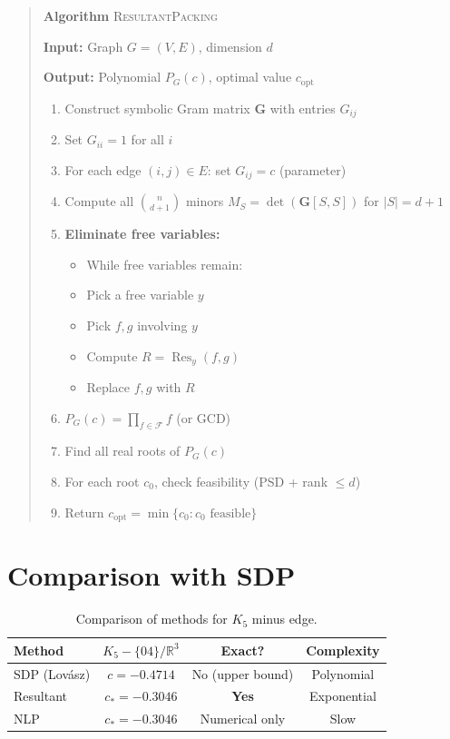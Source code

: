 \documentclass[11pt]{article}
\theoremstyle{definition}
\begin{document}
\begin{quote}
\textbf{Algorithm} \textsc{ResultantPacking}

\textbf{Input:} Graph $G = (V,E)$, dimension $d$

\textbf{Output:} Polynomial $P_G(c)$, optimal value $c_{\mathrm{opt}}$

\begin{enumerate}
    \item Construct symbolic Gram matrix $\mathbf{G}$ with entries $G_{ij}$
    \item Set $G_{ii} = 1$ for all $i$
    \item For each edge $(i,j) \in E$: set $G_{ij} = c$ (parameter)
    \item Compute all $\binom{n}{d+1}$ minors $M_S = \det(\mathbf{G}[S,S])$
    for $|S| = d+1$
    \item \textbf{Eliminate free variables:}
    \begin{itemize}
        \item While free variables remain:
        \item Pick a free variable $y$
        \item Pick $f, g$ involving $y$
        \item Compute $R = \operatorname{Res}_y(f, g)$
        \item Replace $f, g$ with $R$
    \end{itemize}
    \item $P_G(c) = \prod_{f \in \mathcal{F}} f$ (or GCD)
    \item Find all real roots of $P_G(c)$
    \item For each root $c_0$, check feasibility (PSD + rank $\le d$)
    \item Return $c_{\mathrm{opt}} = \min\{c_0 : c_0 \text{ feasible}\}$
\end{enumerate}
\end{quote}

\section{Comparison with SDP}

\begin{table}[h]
\centering
\begin{tabular}{lccc}
\hline
Method & $K_5-\{04\}/\mathbb{R}^3$ & Exact? & Complexity \\
\hline
SDP (Lov\'{a}sz) & $c = -0.4714$ & No (upper bound) & Polynomial \\
Resultant & $c_* = -0.3046$ & \textbf{Yes} & Exponential \\
NLP & $c_* = -0.3046$ & Numerical only & Slow \\
\hline
\end{tabular}
\caption{Comparison of methods for $K_5$ minus edge.}
\end{table}
\end{document}
